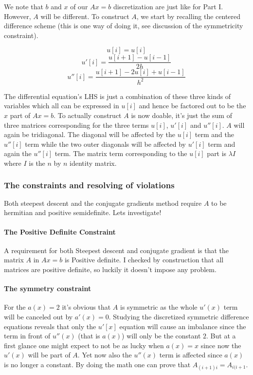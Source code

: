 \documentclass[a4paper,11pt]{article}
\begin{document}
We note that $b$ and $x$ of our $Ax=b$ discretization are just like for
Part I.  However, $A$ will be different. To construct $A$, we start by
recalling the centered difference scheme (this is one way of doing it,
see discussion of the symmetricity constraint).

\[
  u[i] = u[i]
\]
\[
  u'[i] = \frac{u[i+1]-u[i-1]}{2h}
\]
\[
  u''[i] = \frac{u[i+1]-2u[i]+u[i-1]}{h^2}
\]

The differential equation's LHS is just a combination of these
three kinds of variables which all can be expressed in $u[i]$ and
hence be factored out to be the $x$ part of $Ax=b$. To actually
construct $A$ is now doable, it's just the sum of three matrices
corresponding for the three terms $u[i]$, $u'[i]$ and $u''[i]$. $A$ will
again be tridiagonal. The diagonal will be affected by the $u[i]$ term
and the $u''[i]$ term while the two outer diagonals will be affected by
$u'[i]$ term and again the $u''[i]$ term. The matrix term corresponding
to the $u[i]$ part is $\lambda I$ where $I$ is the $n$ by $n$ identity
matrix.

\subsubsection{The constraints and resolving of violations}

Both steepest descent and the conjugate gradients method require
$A$ to be hermitian and positive semidefinite. Lets investigate!

\paragraph{The Positive Definite Constraint}

A requirement for both Steepest descent and conjugate gradient is that
the matrix $A$ in $Ax=b$ is Positive definite. I checked by construction
that all matrices are positive definite, so luckily it doesn't impose
any problem.

\paragraph{The symmetry constraint}

For the $a(x) = 2$ it's obvious that $A$ is symmetric as the whole
$u'(x)$ term will be canceled out by $a'(x) = 0$. Studying the
discretized symmetric difference equations reveals that only the $u'[x]$
equation will cause an imbalance since the term in front of $u''(x)$
(that is $a(x)$) will only be the constant $2$. But at a first glance
one might expect to not be as lucky when $a(x) = x$ since now the
$u'(x)$ will be part of $A$.  Yet now also the $u''(x)$ term is affected
since $a(x)$ is no longer a constant. By doing the math one can prove
that $A_{(i+1)i} = A_{i(i+1}$.
\end{document}
